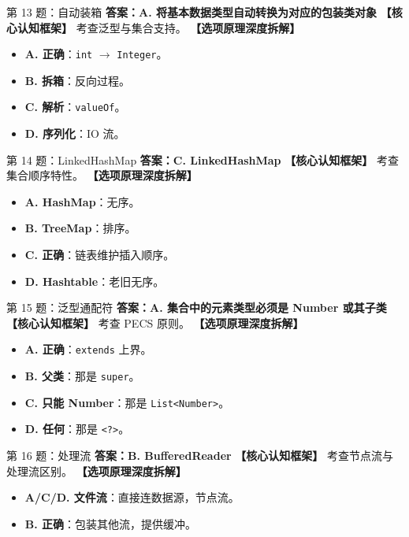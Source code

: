 ﻿\documentclass[12pt, a4paper]{ctexart}
\begin{document}
\begin{bluebox}{第 13 题：自动装箱}
	\textbf{答案：A. 将基本数据类型自动转换为对应的包装类对象}
	\textbf{【核心认知框架】} 考查泛型与集合支持。
	\textbf{【选项原理深度拆解】}
	\begin{itemize}[leftmargin=*, nosep]
		\item \textbf{A. 正确}：\texttt{int} $\rightarrow$ \texttt{Integer}。
		\item \textbf{B. 拆箱}：反向过程。
		\item \textbf{C. 解析}：\texttt{valueOf}。
		\item \textbf{D. 序列化}：IO 流。
	\end{itemize}
\end{bluebox}

\begin{bluebox}{第 14 题：LinkedHashMap}
	\textbf{答案：C. LinkedHashMap}
	\textbf{【核心认知框架】} 考查集合顺序特性。
	\textbf{【选项原理深度拆解】}
	\begin{itemize}[leftmargin=*, nosep]
		\item \textbf{A. HashMap}：无序。
		\item \textbf{B. TreeMap}：排序。
		\item \textbf{C. 正确}：链表维护插入顺序。
		\item \textbf{D. Hashtable}：老旧无序。
	\end{itemize}
\end{bluebox}

\begin{bluebox}{第 15 题：泛型通配符}
	\textbf{答案：A. 集合中的元素类型必须是 Number 或其子类}
	\textbf{【核心认知框架】} 考查 PECS 原则。
	\textbf{【选项原理深度拆解】}
	\begin{itemize}[leftmargin=*, nosep]
		\item \textbf{A. 正确}：\texttt{extends} 上界。
		\item \textbf{B. 父类}：那是 \texttt{super}。
		\item \textbf{C. 只能 Number}：那是 \texttt{List<Number>}。
		\item \textbf{D. 任何}：那是 \texttt{<?>}。
	\end{itemize}
\end{bluebox}

\begin{bluebox}{第 16 题：处理流}
	\textbf{答案：B. BufferedReader}
	\textbf{【核心认知框架】} 考查节点流与处理流区别。
	\textbf{【选项原理深度拆解】}
	\begin{itemize}[leftmargin=*, nosep]
		\item \textbf{A/C/D. 文件流}：直接连数据源，节点流。
		\item \textbf{B. 正确}：包装其他流，提供缓冲。
	\end{itemize}
\end{bluebox}
\end{document}
